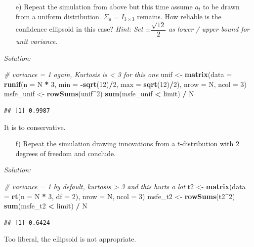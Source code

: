 \documentclass[12pt,a4paper]{article}
\newenvironment{Shaded}{\begin{snugshade}}{\end{snugshade}}
\newcommand{\CommentTok}[1]{\textcolor[rgb]{0.56,0.35,0.01}{\textit{#1}}}
\newcommand{\DataTypeTok}[1]{\textcolor[rgb]{0.13,0.29,0.53}{#1}}
\newcommand{\DecValTok}[1]{\textcolor[rgb]{0.00,0.00,0.81}{#1}}
\newcommand{\KeywordTok}[1]{\textcolor[rgb]{0.13,0.29,0.53}{\textbf{#1}}}
\newcommand{\NormalTok}[1]{#1}
\newcommand{\OperatorTok}[1]{\textcolor[rgb]{0.81,0.36,0.00}{\textbf{#1}}}
\newcommand{\StringTok}[1]{\textcolor[rgb]{0.31,0.60,0.02}{#1}}
\begin{document}
\begin{itemize}
  \item[e)] Repeat the simulation from above but this time assume $a_t$ to be drawn from a uniform distribution. $\Sigma_a = I_{3 \times 3}$ remains. How reliable is the confidence ellipsoid in this case? 
  \textit{Hint: Set $\pm \dfrac{\sqrt{12}}{2}$ as lower / upper bound for unit variance.}
\end{itemize}

\emph{Solution:}

\begin{Shaded}
\begin{Highlighting}[]
\CommentTok{# variance = 1 again, Kurtosis is < 3 for this one}
\NormalTok{unif <-}\StringTok{ }\KeywordTok{matrix}\NormalTok{(}\DataTypeTok{data =} \KeywordTok{runif}\NormalTok{(}\DataTypeTok{n =}\NormalTok{ N }\OperatorTok{*}\StringTok{ }\DecValTok{3}\NormalTok{, }\DataTypeTok{min =} \OperatorTok{-}\KeywordTok{sqrt}\NormalTok{(}\DecValTok{12}\NormalTok{)}\OperatorTok{/}\DecValTok{2}\NormalTok{, }
                            \DataTypeTok{max =} \KeywordTok{sqrt}\NormalTok{(}\DecValTok{12}\NormalTok{)}\OperatorTok{/}\DecValTok{2}\NormalTok{), }\DataTypeTok{nrow =}\NormalTok{ N, }\DataTypeTok{ncol =} \DecValTok{3}\NormalTok{) }
\NormalTok{msfe_unif <-}\StringTok{ }\KeywordTok{rowSums}\NormalTok{(unif}\OperatorTok{^}\DecValTok{2}\NormalTok{)}
\KeywordTok{sum}\NormalTok{(msfe_unif }\OperatorTok{<}\StringTok{ }\NormalTok{limit) }\OperatorTok{/}\StringTok{ }\NormalTok{N}
\end{Highlighting}
\end{Shaded}

\begin{verbatim}
## [1] 0.9987
\end{verbatim}

It is to conservative.

\begin{itemize}
  \item[f)] Repeat the simulation drawing innovations from a $t$-distribution with $2$ degrees of freedom and conclude.
\end{itemize}

\emph{Solution:}

\begin{Shaded}
\begin{Highlighting}[]
\CommentTok{# variance = 1 by default, kurtosis > 3 and this hurts a lot}
\NormalTok{t2 <-}\StringTok{ }\KeywordTok{matrix}\NormalTok{(}\DataTypeTok{data =} \KeywordTok{rt}\NormalTok{(}\DataTypeTok{n =}\NormalTok{ N }\OperatorTok{*}\StringTok{ }\DecValTok{3}\NormalTok{, }\DataTypeTok{df =} \DecValTok{2}\NormalTok{), }\DataTypeTok{nrow =}\NormalTok{ N, }\DataTypeTok{ncol =} \DecValTok{3}\NormalTok{)}
\NormalTok{msfe_t2 <-}\StringTok{ }\KeywordTok{rowSums}\NormalTok{(t2}\OperatorTok{^}\DecValTok{2}\NormalTok{)}
\KeywordTok{sum}\NormalTok{(msfe_t2 }\OperatorTok{<}\StringTok{ }\NormalTok{limit) }\OperatorTok{/}\StringTok{ }\NormalTok{N}
\end{Highlighting}
\end{Shaded}

\begin{verbatim}
## [1] 0.6424
\end{verbatim}

Too liberal, the ellipsoid is not appropriate.
\end{document}
